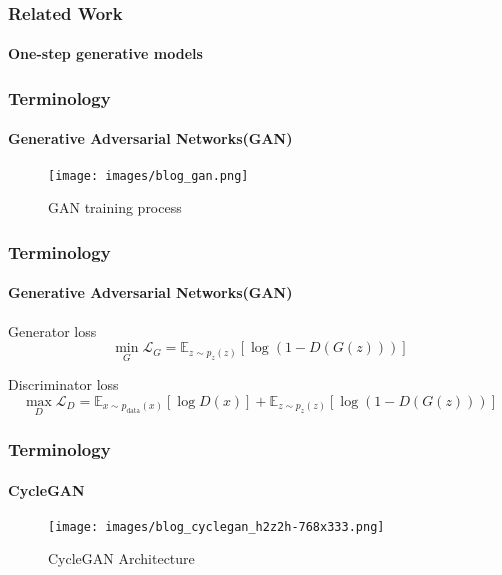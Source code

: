 \documentclass[aspectratio=169, lecture, amberg]{OTHAWbeamer}
\begin{document}
\begin{frame}
\frametitle{Related Work}
\framesubtitle{One-step generative models}

\end{frame}




\begin{frame}
\frametitle{Terminology}
\framesubtitle{Generative Adversarial Networks(GAN)}
\begin{figure}
    \centering
    \texttt{[image: images/blog\_gan.png]}
    \caption{GAN training process}
\end{figure}
\end{frame}

\begin{frame}
\frametitle{Terminology}
\framesubtitle{Generative Adversarial Networks(GAN)}
\begin{block}{Generator loss}
\begin{equation}
\min_G \mathcal{L}_G = \mathbb{E}_{z \sim p_z(z)} [\log(1 - D(G(z)))]
\end{equation}



\end{block}
\begin{block}{Discriminator loss}
\begin{equation}
\max_D \mathcal{L}_D = \mathbb{E}_{x \sim p_{\text{data}}(x)} [\log D(x)] + \mathbb{E}_{z \sim p_z(z)} [\log(1 - D(G(z)))]
\end{equation}\end{block}
\end{frame}

\begin{frame}
\frametitle{Terminology}
\framesubtitle{CycleGAN}
\begin{figure}
    \centering
    \texttt{[image: images/blog\_cyclegan\_h2z2h-768x333.png]}
    \caption{CycleGAN Architecture}
\end{figure}
\end{frame}
\end{document}
